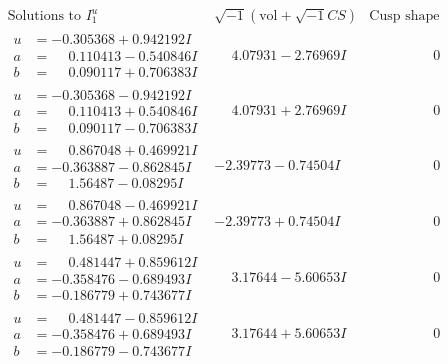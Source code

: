 \documentclass[1p]{elsarticle_modified}
\theoremstyle{definition}
\newcommand{\I}{\sqrt{-1}}
\begin{document}
$$\begin{array}{c|c|c}  
\text{Solutions to }I^u_{1}& \I (\text{vol} + \sqrt{-1}CS) & \text{Cusp shape}\\
 \hline 
\begin{aligned}
u &= -0.305368 + 0.942192 I \\
a &= \phantom{-}0.110413 - 0.540846 I \\
b &= \phantom{-}0.090117 + 0.706383 I\end{aligned}
 & \phantom{-}4.07931 - 2.76969 I & \phantom{-0.000000 } 0 \\ \hline\begin{aligned}
u &= -0.305368 - 0.942192 I \\
a &= \phantom{-}0.110413 + 0.540846 I \\
b &= \phantom{-}0.090117 - 0.706383 I\end{aligned}
 & \phantom{-}4.07931 + 2.76969 I & \phantom{-0.000000 } 0 \\ \hline\begin{aligned}
u &= \phantom{-}0.867048 + 0.469921 I \\
a &= -0.363887 - 0.862845 I \\
b &= \phantom{-}1.56487 - 0.08295 I\end{aligned}
 & -2.39773 - 0.74504 I & \phantom{-0.000000 } 0 \\ \hline\begin{aligned}
u &= \phantom{-}0.867048 - 0.469921 I \\
a &= -0.363887 + 0.862845 I \\
b &= \phantom{-}1.56487 + 0.08295 I\end{aligned}
 & -2.39773 + 0.74504 I & \phantom{-0.000000 } 0 \\ \hline\begin{aligned}
u &= \phantom{-}0.481447 + 0.859612 I \\
a &= -0.358476 - 0.689493 I \\
b &= -0.186779 + 0.743677 I\end{aligned}
 & \phantom{-}3.17644 - 5.60653 I & \phantom{-0.000000 } 0 \\ \hline\begin{aligned}
u &= \phantom{-}0.481447 - 0.859612 I \\
a &= -0.358476 + 0.689493 I \\
b &= -0.186779 - 0.743677 I\end{aligned}
 & \phantom{-}3.17644 + 5.60653 I & \phantom{-0.000000 } 0 \\ \hline\begin{aligned}

\end{aligned}
\end{array}$$
\end{document}
